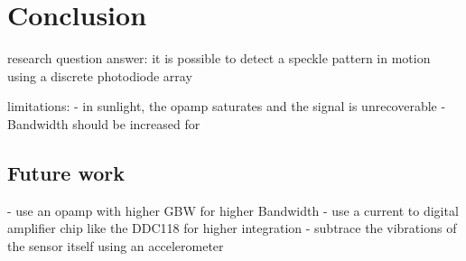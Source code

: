 \section{Conclusion}

research question answer: it is possible to detect a speckle pattern in motion using a discrete photodiode array 


limitations: 
- in sunlight, the opamp saturates and the signal is unrecoverable
- Bandwidth should be increased for

\subsection{Future work}
\label{sub:future_work}

- use an opamp with higher GBW for higher Bandwidth
- use a current to digital amplifier chip like the DDC118 for higher integration
- subtrace the vibrations of the sensor itself using an accelerometer